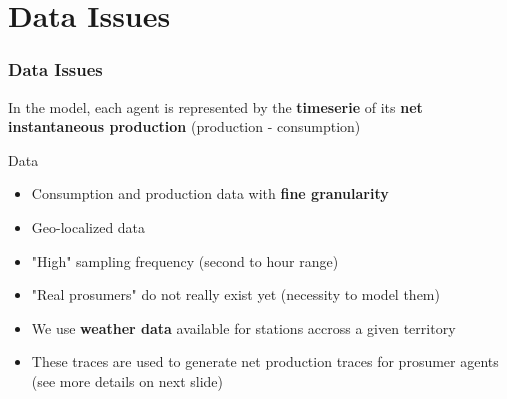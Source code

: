 \documentclass[xcolor=dvipsnames]{beamer}
\begin{document}
\section{Data Issues}
\begin{frame}
	\frametitle{Data Issues}
	
	{\small In the model, each agent is represented by the \textbf{timeserie} of its \textbf{net instantaneous production} (production - consumption)	}
	
	\begin{block}{Data}
		\begin{itemize}
			\item {\small Consumption and production data with \textbf{fine granularity}}
			\item {\small Geo-localized data}
			\item {\small "High" sampling frequency (second to hour range)}
		\end{itemize}
	\end{block}		
	
	\begin{itemize}
		\item {\small "Real prosumers" do not really exist yet (necessity to model them)}
		\item {\small We use \textbf{weather data} available for stations accross a given territory}
		\item {\small These traces are used to generate net production traces for prosumer agents (see more details on next slide)}
	\end{itemize}
	

\end{frame}
\end{document}
